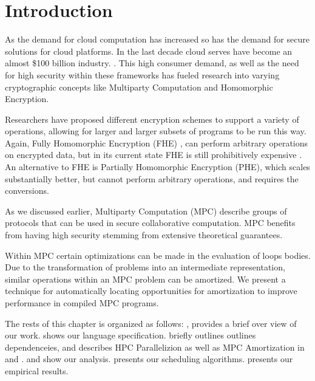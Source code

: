 \section{Introduction}
\label{sec:intro}


As the demand for cloud computation has increased so has the demand for secure solutions 
for cloud platforms. In the last decade cloud serves have become an almost \$100 billion industry. 
\cite{Synergy2019}. This high consumer demand, as well as the need for high security within these
frameworks has fueled research into varying cryptographic concepts like Multiparty Computation and 
Homomorphic Encryption. 

Researchers have proposed different encryption schemes to support 
a variety of operations, allowing for larger and larger subsets of
programs to be run this way. Again, Fully Homomorphic Encryption (FHE) \cite{Gentry:2010},\cite{Gentry:20102}  
can perform arbitrary operations on encrypted data, but in its current state FHE
is still prohibitively expensive \cite{Gentry:2011}. An alternative to FHE 
is Partially Homomorphic Encryption (PHE), which scales substantially better, but cannot 
perform arbitrary operations, and requires the conversions. %

As we discussed earlier, Multiparty Computation (MPC) describe groups of protocols that can be used in secure collaborative
computation. MPC benefits from having high security stemming from extensive theoretical guarantees. 

Within MPC certain optimizations can be made in the evaluation of loops bodies. Due to the transformation of problems into an 
intermediate representation, similar operations within an MPC problem can be amortized. %
We present a technique for automatically locating opportunities for amortization to improve performance in compiled MPC programs. 

The rests of this chapter is organized as follows: , provides a brief over view of our work. 
 shows our language specification.
 briefly outlines outlines dependenceies, and describes HPC Parallelizion as well as 
MPC Amortization in  and . 
 and  show our analysis.  
presents our scheduling algorithms.  presents our empirical results. 
